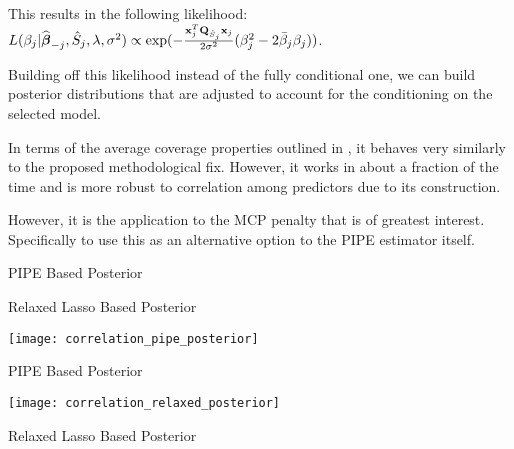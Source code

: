 
This results in the following likelihood: $L(\beta_j|\widehat{\boldsymbol{\beta}}_{-j}, \hat{S}_j, \lambda, \sigma^2) \propto \exp(-\frac{\mathbf{x}_j^T \mathbf{Q}_{\hat{S}_j} \mathbf{x}_j}{2\sigma^2}(\beta_{j}^2 - 2 \bar{\beta}_{j} \beta_{j}))$. 

Building off this likelihood instead of the fully conditional one, we can build posterior distributions that are adjusted to account for the conditioning on the selected model.

In terms of the average coverage properties outlined in , it behaves very similarly to the proposed methodological fix. However, it works in about a fraction of the time and is more robust to correlation among predictors due to its construction. 

However, it is the application to the MCP penalty that is of greatest interest. Specifically to use this as an alternative option to the PIPE estimator itself.
\begin{table}[hbtp]
    \centering
    
    \caption{\label{Tab:dist_beta} PIPE Based Posterior}
\end{table}

\begin{table}[hbtp]
    \centering
    
    \caption{\label{Tab:dist_beta_relaxed} Relaxed Lasso Based Posterior}
\end{table}


\begin{table}[hbtp]
    \centering
    \texttt{[image: correlation\_pipe\_posterior]}
    \caption{\label{Fig:corr_pipe} PIPE Based Posterior}
\end{table}

\begin{table}[hbtp]
    \centering
    \texttt{[image: correlation\_relaxed\_posterior]}
    \caption{\label{Fig:corr_relaxed} Relaxed Lasso Based Posterior}
\end{table}
    
